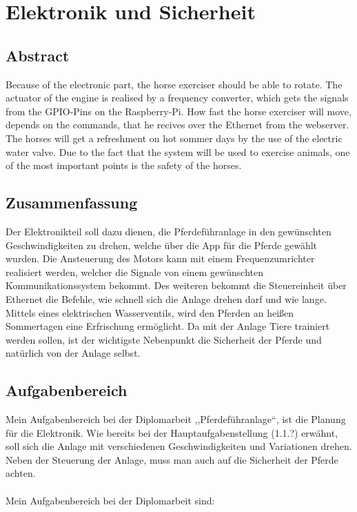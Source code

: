 \chapter{Elektronik und Sicherheit}
\label{sec:elektronikUndSicherheit}

\section{Abstract}
\label{sec:abstract}

Because of the electronic part, the horse exerciser should be able to rotate. 
The actuator of the engine is realised by a frequency converter, which gets the signals from the GPIO-Pins on the Raspberry-Pi.
How fast the horse exerciser will move, depends on the commands, that he recives over the Ethernet from the webserver.
The horses will get a refreshment on hot sommer days by the use of the electric water valve.
Due to the fact that the system will be used to exercise animals, one of the most important points is the safety of the horses.

\section{Zusammenfassung}
\label{sec:zusammenfassung}

Der Elektronikteil soll dazu dienen, die Pferdeführanlage in den gewünschten Geschwindigkeiten zu drehen, welche über die App für die Pferde gewählt wurden. 
Die Ansteuerung des Motors kann mit einem Frequenzumrichter realisiert werden, 
welcher die Signale von einem gewünschten Kommunikationssystem bekommt.
Des weiteren bekommt die Steuereinheit über Ethernet die Befehle, wie schnell sich die Anlage drehen darf und wie lange. 
Mittels eines elektrischen Wasserventils, wird den Pferden an heißen Sommertagen eine Erfrischung ermöglicht. 
Da mit der Anlage Tiere trainiert werden sollen, ist der wichtigste Nebenpunkt die Sicherheit der Pferde und natürlich von der Anlage selbst.
\newpage

\section{Aufgabenbereich}
\label{sec:aufgabenbereich}

Mein Aufgabenbereich bei der Diplomarbeit ,,Pferdeführanlage“, ist die Planung für die Elektronik. Wie bereits bei der Hauptaufgabenstellung (1.1.?) erwähnt, 
soll sich die Anlage mit verschiedenen Geschwindigkeiten und Variationen drehen.  Neben der Steuerung der Anlage, muss man auch auf die Sicherheit der Pferde achten.
\\
\\
Mein Aufgabenbereich bei der Diplomarbeit sind:

